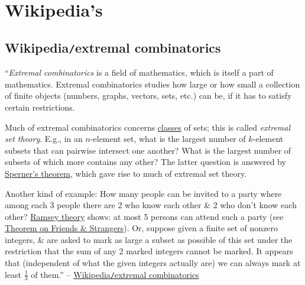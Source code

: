 \documentclass{article}
\begin{document}

\section{Wikipedia's}

\subsection{Wikipedia{\tt/}extremal combinatorics}
``{\it Extremal combinatorics} is a field of mathematics, which is itself a part of mathematics. Extremal combinatorics studies how large or how small a collection of finite objects (numbers, graphs, vectors, sets, etc.) can be, if it has to satisfy certain restrictions.

Much of extremal combinatorics concerns \href{https://en.wikipedia.org/wiki/Class_(set_theory)}{classes} of sets; this is called {\it extremal set theory}. E.g., in an $n$-element set, what is the largest number of $k$-element subsets that can pairwise intersect one another? What is the largest number of subsets of which more contains any other? The latter question is answered by \href{https://en.wikipedia.org/wiki/Sperner%27s_theorem}{Sperner's theorem}, which gave rise to much of extremal set theory.

Another kind of example: How many people can be invited to a party where among each 3 people there are 2 who know each other \& 2 who don't know each other? \href{https://en.wikipedia.org/wiki/Ramsey_theory}{Ramsey theory} shows: at most 5 persons can attend such a party (see \href{https://en.wikipedia.org/wiki/Theorem_on_Friends_and_Strangers}{Theorem on Friends \& Strangers}). Or, suppose given a finite set of nonzero integers, \& are asked to mark as large a subset as possible of this set under the restriction that the sum of any 2 marked integers cannot be marked. It appears that (independent of what the given integers actually are) we can always mark at least $\frac{1}{3}$ of them.'' -- \href{https://en.wikipedia.org/wiki/Extremal_combinatorics}{Wikipedia{\tt/}extremal combinatorics}

\end{document}
